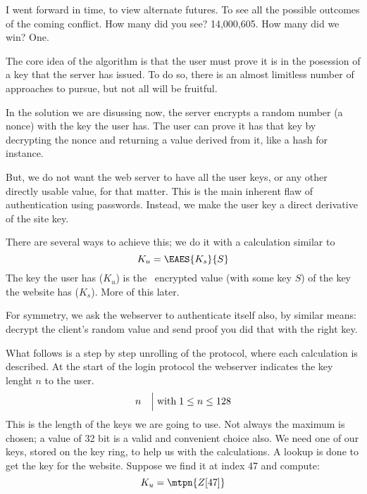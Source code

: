 \begin{dialogue}
	I went forward in time, to view alternate futures. To see all the possible outcomes of the coming conflict.
   How many did you see?
	14,000,605.
	How many did we win?
	One.
\end{dialogue}
The core idea of the algorithm is that the user must prove it is in the posession of a key that the server has issued.
To do so, there is an almost limitless number of approaches to pursue, but not all will be fruitful.
\par
In the solution we are disussing now, the server encrypts a random number (a nonce) with the key the user has.
The user can prove it has that key by decrypting the nonce and returning a value derived from it, like a hash for instance.
\par
But, we do not want the web server to have all the user keys, or any other directly usable value, for that matter.
This is the main inherent flaw of authentication using passwords.
Instead, we make the user key a direct derivative of the site key.
\par
There are several ways to achieve this; we do it with a calculation similar to
\[K_u = \EAES{K_s}{S}\]
The key the user has (\(K_u\)) is the \AES\ encrypted value (with some key \(S\)) of the key the website has (\(K_s\)).
More of this later.
\par
For symmetry, we ask the webserver to authenticate itself also, by similar means: decrypt the client's random value and send proof you did that with the right key.
\par
What follows is a step by step unrolling of the protocol, where each calculation is described.
At the start of the login protocol the webserver indicates the key lenght \(n\) to the user.
\[n\quad\Bigl\lvert\thickspace\text{with}\thickspace 1\le{n}\le128\]
This is the length of the keys we are going to use.
Not always the maximum is chosen; a value of 32 bit is a valid and convenient choice also.
We need one of our keys, stored on the key ring, to help us with the calculations.
A lookup is done to get the key for the website.
Suppose we find it at index 47 and compute:
\begin{equation}\label{rud:uku}
K_u = \mtpn{Z[47]}
\end{equation}

